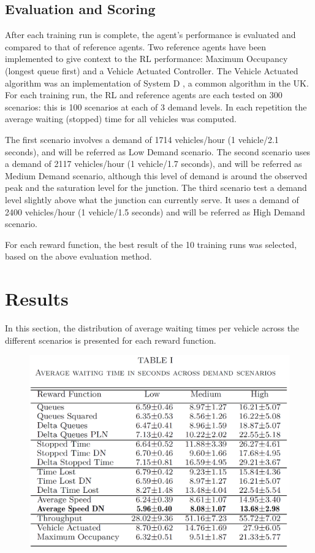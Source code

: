 \documentclass[conference]{IEEEtran}
\begin{document}
\subsection{Evaluation and Scoring}
After each training run is complete, the agent's performance is evaluated and compared to that of reference agents. Two reference agents have been implemented to give context to the RL performance: Maximum Occupancy (longest queue first) and a Vehicle Actuated Controller. The Vehicle Actuated algorithm was an implementation of System D \cite{highways}, a common algorithm in the UK.  For each training run, the RL and reference agents are each tested on 300 scenarios: this is 100 scenarios at each of 3 demand levels. In each repetition the average waiting (stopped) time for all vehicles was computed.

The first scenario involves a demand of 1714 vehicles/hour (1 vehicle/2.1 seconds), and will be referred as Low Demand scenario.
The second scenario uses a demand of 2117 vehicles/hour (1 vehicle/1.7 seconds), and will be referred as Medium Demand scenario, although this level of demand is around the observed peak and the saturation level for the junction.
The third scenario test a demand level slightly above what the junction can currently serve. It uses a demand of 2400 vehicles/hour (1 vehicle/1.5 seconds) and will be referred as High Demand scenario.

For each reward function, the best result of the 10 training runs was selected, based on the above evaluation method.

\section{Results}\label{results}
In this section, the distribution of average waiting times per vehicle across the different scenarios is presented for each reward function.

\begin{figure}[thpb]
    \centering
    \includegraphics[width=\linewidth]{figures/table.png}
    \label{fig:table}
\end{figure}
\end{document}
